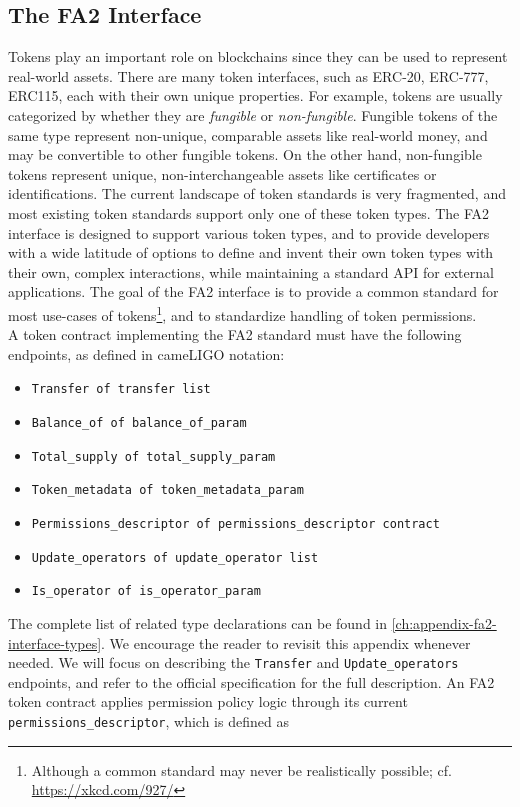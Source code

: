 \documentclass[twoside,11pt,openright]{report}
\newcommand{\coq}[1]{\texttt{#1}}
\begin{document}
\subsection{The FA2 Interface}
\label{sec:fa2-interface}
Tokens play an important role on blockchains since they can be used to represent real-world assets. There are many token interfaces, such as ERC-20, ERC-777, ERC115, each with their own unique properties. For example, tokens are usually categorized by whether they are \textit{fungible} or \textit{non-fungible}. Fungible tokens of the same type represent non-unique, comparable assets like real-world money, and may be convertible to other fungible tokens. On the other hand, non-fungible tokens represent unique, non-interchangeable assets like certificates or identifications. The current landscape of token standards is very fragmented, and most existing token standards support only one of these token types. The FA2 interface is designed to support various token types, and to provide developers with a wide latitude of options to define and invent their own token types with their own, complex interactions, while maintaining a standard API for external applications. The goal of the FA2 interface is to provide a common standard for most use-cases of tokens\footnote{Although a common standard may never be realistically possible; cf. \url{https://xkcd.com/927/}}, and to standardize handling of token permissions.\medskip\\
A token contract implementing the FA2 standard must have the following endpoints, as defined in cameLIGO notation:
\begin{itemize}
    \item \coq{Transfer of transfer list}
    \item \coq{Balance\_of of balance\_of\_param}
    \item \coq{Total\_supply of total\_supply\_param}
    \item \coq{Token\_metadata of token\_metadata\_param}
    \item \coq{Permissions\_descriptor of permissions\_descriptor contract}
    \item \coq{Update\_operators of update\_operator list}
    \item \coq{Is\_operator of is\_operator\_param}
\end{itemize}
The complete list of related type declarations can be found in \autoref{ch:appendix-fa2-interface-types}. We encourage the reader to revisit this appendix whenever needed. We will focus on describing the \coq{Transfer} and \coq{Update\_operators} endpoints, and refer to the official specification for the full description\cite{tzip12-fa2}. An FA2 token contract applies permission policy logic through its current \coq{permissions\_descriptor}, which is defined as
\end{document}
